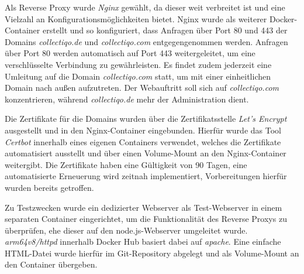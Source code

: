 Als Reverse Proxy wurde \textit{Nginx} gewählt, da dieser weit verbreitet ist und eine Vielzahl an Konfigurationsmöglichkeiten bietet.
Nginx wurde als weiterer Docker-Container erstellt und so konfiguriert, dass Anfragen über Port 80 und 443 der Domains \textit{collectiqo.de} und \textit{collectiqo.com} entgegengenommen werden.
Anfragen über Port 80 werden automatisch auf Port 443 weitergeleitet, um eine verschlüsselte Verbindung zu gewährleisten.
Es findet zudem jederzeit eine Umleitung auf die Domain \textit{collectiqo.com} statt, um mit einer einheitlichen Domain nach außen aufzutreten.
Der Webauftritt soll sich auf \textit{collectiqo.com} konzentrieren, während \textit{collectiqo.de} mehr der Administration dient.

Die Zertifikate für die Domains wurden über die Zertifikatsstelle \textit{Let's Encrypt} ausgestellt und in den Nginx-Container eingebunden.
Hierfür wurde das Tool \textit{Certbot} innerhalb eines eigenen Containers verwendet, welches die Zertifikate automatisiert ausstellt und über einen Volume-Mount an den Nginx-Container weitergibt.
Die Zertifikate haben eine Gültigkeit von 90 Tagen, eine automatisierte Erneuerung wird zeitnah implementiert, Vorbereitungen hierfür wurden bereits getroffen.

Zu Testzwecken wurde ein dedizierter Webserver als Test-Webserver in einem separaten Container eingerichtet, um die Funktionalität des Reverse Proxys zu überprüfen, ehe dieser auf den node.js-Webserver umgeleitet wurde.
\textit{arm64v8/httpd} innerhalb Docker Hub basiert dabei auf \textit{apache}.
Eine einfache HTML-Datei wurde hierfür im Git-Repository abgelegt und als Volume-Mount an den Container übergeben.

